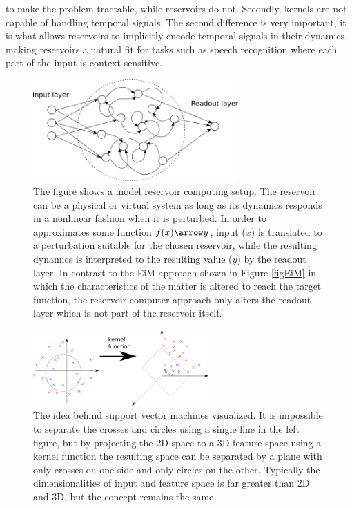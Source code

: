 to make the problem tractable, while reservoirs do not.
Secondly, kernels are not capable of handling temporal signals.
The second difference is very important, it is what allows reservoirs to
implicitly encode temporal signals in their dynamics, making reservoirs a
natural fit for tasks such as speech recognition where each part of the input is
context sensitive.
\begin{figure}[h!]
  \centering
  \includegraphics[width=0.7\textwidth]{fig/reservoirz.png}
  \caption[Model of a reservoir computer]{
    The figure shows a model reservoir computing setup.
    The reservoir can be a physical or virtual system as long as its dynamics
    responds in a nonlinear fashion when it is perturbed. 
    In order to approximates some function $f(x) \arrow y$, input ($x$) is
    translated to a perturbation suitable for the chosen reservoir, while the
    resulting dynamics is interpreted to the resulting value ($y$) by the
    readout layer.
    In contrast to the EiM approach shown in Figure \ref{figEiM} in which the
    characteristics of the matter is altered to reach the target function, the
    reservoir computer approach only alters the readout layer which is not part
    of the reservoir itself.
  }
  \label{figRC}
\end{figure}
\begin{figure}[h!]
  \centering
  \includegraphics[width=0.6\textwidth]{fig/svmthing.png}
  \caption[Support vector machine]{
    The idea behind support vector machines visualized.
    It is impossible to separate the crosses and circles using a single line in
    the left figure, but by projecting the 2D space to a 3D feature space using
    a kernel function the resulting space can be separated by a plane with only
    crosses on one side and only circles on the other.
    Typically the dimensionalities of input and feature space is far greater
    than 2D and 3D, but the concept remains the same.
  }
  \label{figSVM}
\end{figure}
